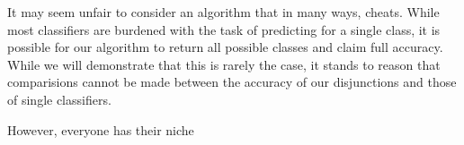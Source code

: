 It may seem unfair to consider an algorithm that in many ways, cheats. While most classifiers are burdened with the task of predicting for a single class, it is possible for our algorithm to return all possible classes and claim full accuracy. While we will demonstrate that this is rarely the case, it stands to reason that comparisions cannot be made between the accuracy of our disjunctions and those of single classifiers.

However, everyone has their niche
